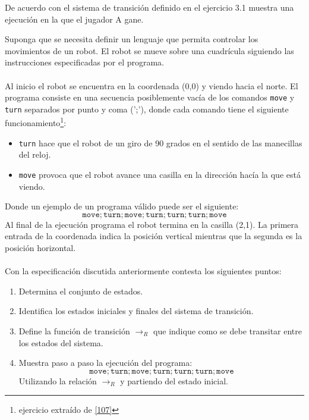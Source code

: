     \begin{exercise}
        De acuerdo con el sistema de transición definido en el ejercicio 3.1 muestra una ejecución en la que el jugador A gane.
    \end{exercise}

    \begin{exercise}
        Suponga que se necesita definir un lenguaje que permita controlar los movimientos de un robot. El robot se mueve sobre una cuadrícula siguiendo las instrucciones especificadas por el programa. \\\\
        Al inicio el robot se encuentra en la coordenada (0,0) y viendo hacia el norte. El programa consiste en una secuencia posiblemente 
        vacía de los comandos \texttt{move} y \texttt{turn} separados por punto y coma (';'), donde cada comando tiene el siguiente funcionamiento\footnote{ejercicio extraído de \hyperlink{107}{[107]}}:\\
    
        \begin{itemize}
            \item \texttt{turn} hace que el robot de un giro de 90 grados en el sentido de las manecillas del reloj.
            \item \texttt{move} provoca que el robot avance una casilla en la dirección hacía la que está viendo.\\
        \end{itemize}

        Donde un ejemplo de un programa válido puede ser el siguiente:
        \[   \texttt{move};\texttt{turn};\texttt{move};\texttt{turn};\texttt{turn};\texttt{turn};\texttt{move} \]
        Al final de la ejecución programa el robot termina en la casilla (2,1). La primera entrada de la coordenada
        indica la posición vertical mientras que la segunda es la posición horizontal.\\\\

        Con la especificación discutida anteriormente contesta los siguientes puntos:\\

        \begin{enumerate}
            \item Determina el conjunto de estados. 
            \item Identifica los estados iniciales y finales del sistema de transición.
            \item Define la función de transición $\rightarrow_R$ que indique como se debe transitar entre los estados del sistema.
            \item Muestra paso a paso la ejecución del programa:
                  \[  \texttt{move};\texttt{turn};\texttt{move};\texttt{turn};\texttt{turn};\texttt{turn};\texttt{move} \]
                  Utilizando la relación $\rightarrow_R$ y partiendo del estado inicial.
         \end{enumerate}

    \end{exercise}


